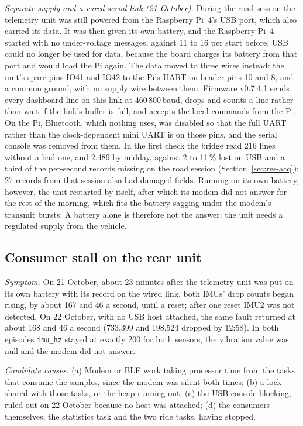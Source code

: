 \emph{Separate supply and a wired serial link (21 October).} During the road session the telemetry unit was still powered from the Raspberry Pi~4's USB port, which also carried its data. It was then given its own battery, and the Raspberry Pi~4 started with no under-voltage messages, against 11 to 16 per start before. USB could no longer be used for data, because the board charges its battery from that port and would load the Pi again. The data moved to three wires instead: the unit's spare pins IO41 and IO42 to the Pi's UART on header pins 10 and 8, and a common ground, with no supply wire between them. Firmware v0.7.4.1 sends every dashboard line on this link at 460\,800\,baud, drops and counts a line rather than wait if the link's buffer is full, and accepts the local commands from the Pi. On the Pi, Bluetooth, which nothing uses, was disabled so that the full UART rather than the clock-dependent mini UART is on those pins, and the serial console was removed from them. In the first check the bridge read 216 lines without a bad one, and 2,489 by midday, against 2 to 11\,\% lost on USB and a third of the per-second records missing on the road session (Section~\ref{sec:res-acq}); 27 records from that session also had damaged fields. Running on its own battery, however, the unit restarted by itself, after which its modem did not answer for the rest of the morning, which fits the battery sagging under the modem's transmit bursts. A battery alone is therefore not the answer: the unit needs a regulated supply from the vehicle.



\subsection{Consumer stall on the rear unit}
\label{sec:inv-stall}

\emph{Symptom.} On 21 October, about 23 minutes after the telemetry unit was put on its own battery with its record on the wired link, both IMUs' drop counts began rising, by about 167 and 46 a second, until a reset; after one reset IMU2 was not detected. On 22 October, with no USB host attached, the same fault returned at about 168 and 46 a second (733,399 and 198,524 dropped by 12:58). In both episodes \texttt{imu\_hz} stayed at exactly 200 for both sensors, the vibration value was null and the modem did not answer.

\emph{Candidate causes.} (a) Modem or BLE work taking processor time from the tasks that consume the samples, since the modem was silent both times; (b) a lock shared with those tasks, or the heap running out; (c) the USB console blocking, ruled out on 22 October because no host was attached; (d) the consumers themselves, the statistics task and the two ride tasks, having stopped.

